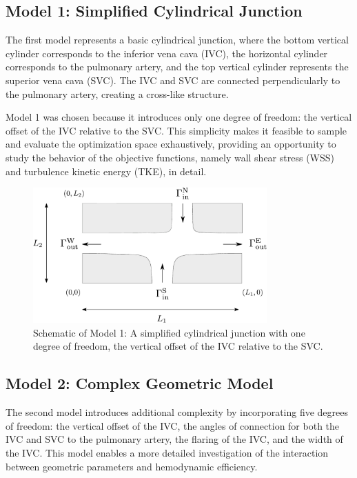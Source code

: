 \subsection{Model 1: Simplified Cylindrical Junction}

The first model represents a basic cylindrical junction, where the bottom vertical cylinder corresponds to the inferior vena cava (IVC), the horizontal cylinder corresponds to the pulmonary artery, and the top vertical cylinder represents the superior vena cava (SVC). The IVC and SVC are connected perpendicularly to the pulmonary artery, creating a cross-like structure. 

Model 1 was chosen because it introduces only one degree of freedom: the vertical offset of the IVC relative to the SVC. This simplicity makes it feasible to sample and evaluate the optimization space exhaustively, providing an opportunity to study the behavior of the objective functions, namely wall shear stress (WSS) and turbulence kinetic energy (TKE), in detail.

\begin{figure}[H]
	\centering
	\includegraphics[width=0.8\textwidth]{figures/krizovatka-obecna.pdf} %
	\caption[Simplified Cylindrical Junction]{Schematic of Model 1: A simplified cylindrical junction with one degree of freedom, the vertical offset of the IVC relative to the SVC.}
	\label{fig:model1_schematic}
\end{figure}

\subsection{Model 2: Complex Geometric Model}

The second model introduces additional complexity by incorporating five degrees of freedom: the vertical offset of the IVC, the angles of connection for both the IVC and SVC to the pulmonary artery, the flaring of the IVC, and the width of the IVC. This model enables a more detailed investigation of the interaction between geometric parameters and hemodynamic efficiency.

